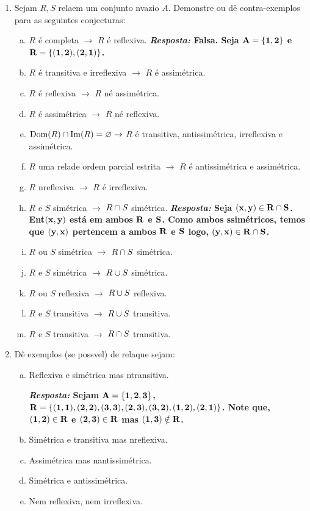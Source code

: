 \begin{enumerate}[{\bf 1.}]
\item Sejam $R,S$ rela\coes em um conjunto n\ao vazio $A$. Demonstre ou d\^e contra-exemplos para as seguintes conjecturas:
\begin{enumerate}[a)]
\item $R$ \'e completa $\to$ $R$ \'e reflexiva. {\bf{\it Resposta:} Falsa. Seja ${\bf A=\{1,2\}}$ e ${\bf R=\{(1,2),(2,1)\}}$.}
\item $R$ \'e transitiva e irreflexiva $\to$ $R$ \'e assim\'etrica.
\item $R$ \'e reflexiva $\to$ $R$ n\ao \'e assim\'etrica. 
\item $R$ \'e assim\'etrica $\to$ $R$ n\ao \'e reflexiva.
\item $\operatorname{Dom}(R)\cap \operatorname{Im}(R)=\varnothing\to$ $R$ \'e transitiva, antissim\'etrica, irreflexiva e assim\'etrica.
\item $R$ uma rela\cao de ordem parcial estrita $\to$ $R$ \'e antissim\'etrica e assim\'etrica. 
\item $R$ n\ao reflexiva $\to$ $R$ \'e irreflexiva.
\item $R$ e $S$ sim\'etrica $\to$ $R\cap S$ sim\'etrica. {\bf{\it Resposta:} Seja ${\bf (x,y)\in R\cap S}$. Ent\ao ${\bf (x,y)}$ est\'a em ambos ${\bf R}$ e ${\bf S}$. Como ambos s\ao sim\'etricos, temos que ${\bf (y,x)}$ pertencem a ambos ${\bf R}$ e ${\bf S}$ logo, ${\bf (y,x)\in R\cap S}$.}
\item $R$ ou $S$ sim\'etrica $\to$ $R\cap S$ sim\'etrica.
\item $R$ e $S$ sim\'etrica $\to$ $R\cup S$ sim\'etrica.
\item $R$ ou $S$ reflexiva $\to$ $R\cup S$ reflexiva.
\item $R$ e $S$ transitiva $\to$ $R\cup S$ transitiva.
\item $R$ e $S$ transitiva $\to$ $R\cap S$ transitiva.
\end{enumerate}

\item D\^e exemplos (se poss\ih vel) de rela\coes que sejam:
\begin{enumerate}[a)]
\item Reflexiva e sim\'etrica mas n\ao transitiva.

{\bf{\it Resposta:} Sejam ${\bf A=\{1,2,3\}}$, ${\bf R=\{(1,1),(2,2),(3,3),(2,3),(3,2),(1,2),(2,1)\}}$. Note que, ${\bf (1,2)\in R}$ e ${\bf (2,3)\in R}$ mas ${\bf (1,3)\notin R}$.}

\item Sim\'etrica e transitiva mas n\ao reflexiva.
\item Assim\'etrica mas n\ao antissim\'etrica.
\item Sim\'etrica e antissim\'etrica.
\item Nem reflexiva, nem irreflexiva.
\end{enumerate}


\end{enumerate}
